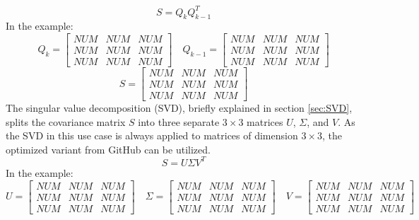 \begin{equation*}
    S= Q_{k}Q_{k-1}^{T}
\end{equation*}
In the example:
\begin{equation*}
    Q_{k}=
    \begin{bmatrix}
        NUM & NUM & NUM \\
        NUM & NUM & NUM \\
        NUM & NUM & NUM
    \end{bmatrix} \quad
    Q_{k-1}=
    \begin{bmatrix}
        NUM & NUM & NUM \\
        NUM & NUM & NUM \\
        NUM & NUM & NUM
    \end{bmatrix}
\end{equation*}
\begin{equation*}
    S= 
    \begin{bmatrix}
        NUM & NUM & NUM \\
        NUM & NUM & NUM \\
        NUM & NUM & NUM
    \end{bmatrix}
\end{equation*}
The singular value decomposition (SVD), briefly explained in section \ref{sec:SVD}, splits the covariance matrix $S$ into three separate $3\times3$ matrices $U$, $\Sigma$, and $V$. As the SVD in this use case is always applied to matrices of dimension $3\times3$, the optimized variant\cite{Gao:2018:GPU_MPM} from GitHub\cite{Github_SVD_CUDA} can be utilized.
\begin{equation*}
    S= U\Sigma V^{T}
\end{equation*}
In the example:
\begin{equation*}
    U=
    \begin{bmatrix}
        NUM & NUM & NUM \\
        NUM & NUM & NUM \\
        NUM & NUM & NUM
    \end{bmatrix} \quad
    \Sigma=
    \begin{bmatrix}
        NUM & NUM & NUM \\
        NUM & NUM & NUM \\
        NUM & NUM & NUM
    \end{bmatrix} \quad
    V=
    \begin{bmatrix}
        NUM & NUM & NUM \\
        NUM & NUM & NUM \\
        NUM & NUM & NUM
    \end{bmatrix}
\end{equation*}
